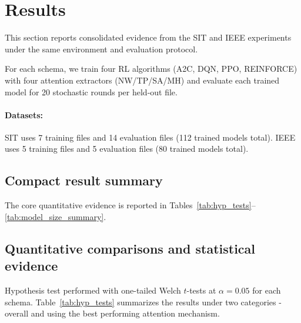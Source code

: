 \documentclass[sn-basic]{sn-jnl} %
\begin{document}
\section{Results} \label{sec:results}
This section reports consolidated evidence from the SIT and IEEE experiments under the same environment and evaluation protocol.

For each schema, we train four RL algorithms (\textsc{A2C}, \textsc{DQN}, \textsc{PPO}, \textsc{REINFORCE}) with four attention extractors (NW/TP/SA/MH) and evaluate each trained model for 20 stochastic rounds per held-out file.

\paragraph{Datasets:}
SIT uses 7 training files and 14 evaluation files (112 trained models total). IEEE uses 5 training files and 5 evaluation files (80 trained models total).

\subsection{Compact result summary}
The core quantitative evidence is reported in Tables~\ref{tab:hyp_tests}--\ref{tab:model_size_summary}.

\subsection{Quantitative comparisons and statistical evidence}
\label{sec:hypothesis_tests}
Hypothesis test performed with one-tailed Welch $t$-tests at $\alpha=0.05$ for each schema. Table~\ref{tab:hyp_tests} summarizes the results under two categories - overall and using the best performing attention mechanism.
\end{document}
